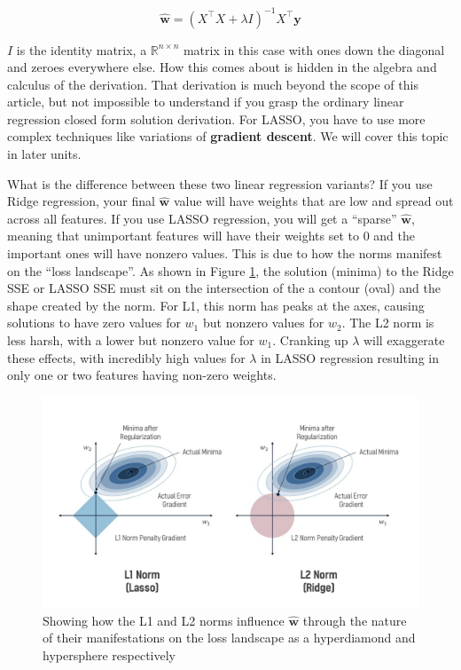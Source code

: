     $$\hat{\textbf{w}} = (X^{\top}X + \lambda I)^{-1}X^{\top}\textbf{y}$$

    $I$ is the identity matrix, a $\mathbb{R}^{n \times n}$ matrix in this case with ones down the diagonal and zeroes everywhere else. How this comes about is hidden in the algebra and calculus of the derivation. That derivation is much beyond the scope of this article, but not impossible to understand if you grasp the ordinary linear regression closed form solution derivation. For LASSO, you have to use more complex techniques like variations of \textbf{gradient descent}. We will cover this topic in later units.

    What is the difference between these two linear regression variants? If you use Ridge regression, your final $\hat{\textbf{w}}$ value will have weights that are low and spread out across all features. If you use LASSO regression, you will get a ``sparse'' $\hat{\textbf{w}}$, meaning that unimportant features will have their weights set to 0 and the important ones will have nonzero values. This is due to how the norms manifest on the ``loss landscape''. As shown in Figure \ref{fig:l1_l2}, the solution (minima) to the Ridge SSE or LASSO SSE must sit on the intersection of the a contour (oval) and the shape created by the norm. For L1, this norm has peaks at the axes, causing solutions to have zero values for $w_1$ but nonzero values for $w_2$. The L2 norm is less harsh, with a lower but nonzero value for $w_1$. Cranking up $\lambda$ will exaggerate these effects, with incredibly high values for $\lambda$ in LASSO regression resulting in only one or two features having non-zero weights.

    \begin{figure}[H]
        \centering
        \includegraphics[width=0.9\linewidth]{ml/l1_l2.jpg}
        \caption{Showing how the L1 and L2 norms influence $\hat{\textbf{w}}$ through the nature of their manifestations on the loss landscape as a hyperdiamond and hypersphere respectively}
        \label{fig:l1_l2}
    \end{figure}

